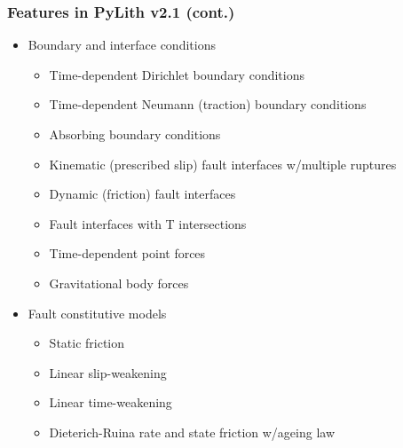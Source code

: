 \documentclass{beamer}
\begin{document}
\begin{frame}
  \frametitle{Features in PyLith v2.1 (cont.)}
  \summary{}

  \begin{itemize}
  \item Boundary and interface conditions
    \begin{itemize}
    \item Time-dependent Dirichlet boundary conditions
    \item Time-dependent Neumann (traction) boundary conditions
    \item Absorbing boundary conditions
    \item Kinematic (prescribed slip) fault interfaces w/multiple ruptures
    \item Dynamic (friction) fault interfaces
    \item Fault interfaces with T intersections
    \item Time-dependent point forces
    \item Gravitational body forces
    \end{itemize}
  \item Fault constitutive models
    \begin{itemize}
    \item Static friction
    \item Linear slip-weakening
    \item Linear time-weakening
    \item Dieterich-Ruina rate and state friction w/ageing law
   \end{itemize}
 \end{itemize}

\end{frame}
\end{document}
